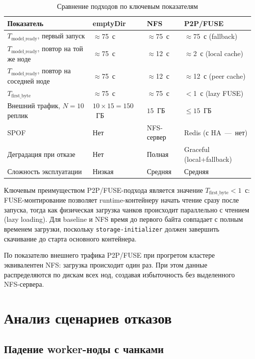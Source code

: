 \begin{table}[htbp]
\centering
\caption{Сравнение подходов по ключевым показателям}
\label{tab:comparison}
\small
\begin{tabularx}{\textwidth}{lXXX}
\toprule
\textbf{Показатель} & \textbf{emptyDir} & \textbf{NFS} & \textbf{P2P/FUSE} \\
\midrule
$T_{\mathrm{model\_ready}}$, первый запуск & $\approx$75~с & $\approx$75~с & $\approx$75~с (fallback) \\
$T_{\mathrm{model\_ready}}$, повтор на той же ноде & $\approx$75~с & $\approx$12~с & $\approx$2~с (local cache) \\
$T_{\mathrm{model\_ready}}$, повтор на соседней ноде & $\approx$75~с & $\approx$12~с & $\approx$12~с (peer cache) \\
$T_{\mathrm{first\_byte}}$ & $\approx$75~с & $\approx$75~с & $<$1~с (lazy FUSE) \\
Внешний трафик, $N=10$ реплик & $10 \times 15 = 150$~ГБ & $15$~ГБ & $\leq 15$~ГБ \\
SPOF & Нет & NFS-сервер & Redis (с HA~---~нет) \\
Деградация при отказе & Нет & Полная & Graceful (local+fallback) \\
Сложность эксплуатации & Низкая & Средняя & Средняя \\
\bottomrule
\end{tabularx}
\end{table}

Ключевым преимуществом P2P/FUSE-подхода является значение $T_{\mathrm{first\_byte}} < 1$~с: FUSE-монтирование позволяет runtime-контейнеру начать чтение сразу после запуска, тогда как физическая загрузка чанков происходит параллельно с чтением (lazy loading). Для baseline и NFS время до первого байта совпадает с полным временем загрузки, поскольку \texttt{storage-initializer} должен завершить скачивание до старта основного контейнера.

По показателю внешнего трафика P2P/FUSE при прогретом кластере эквивалентен NFS: загрузка происходит один раз. При этом данные распределяются по дискам всех нод, создавая избыточность без выделенного NFS-сервера.

\section{Анализ сценариев отказов}

\subsection*{Падение worker-ноды с чанками}

